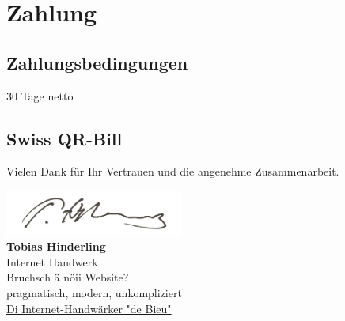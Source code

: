 \documentclass[11pt]{article}
\begin{document}
\newpage
\section*{Zahlung}

\subsection*{Zahlungsbedingungen}
30 Tage netto

\vspace{1cm}

\subsection*{Swiss QR-Bill}
\noindent{}



\vspace{2em}

Vielen Dank für Ihr Vertrauen und die angenehme Zusammenarbeit.

\vspace{2cm}

\noindent
\begin{minipage}{10cm}
\includegraphics[height=1.5cm]{../eigene_firma/briefvorlage/Unterschrift2.png}\\[0.5em]
\textbf{Tobias Hinderling}\\
Internet Handwerk\\[0.5em]
Bruchsch ä nöii Website?\\[0.3em]
pragmatisch, modern, unkompliziert\\[0.5em]
\href{https://www.hinderling-internet-handwerk.ch}{\textcolor{brand}{Di Internet-Handwärker "de Bieu"}}
\end{minipage}
\end{document}
